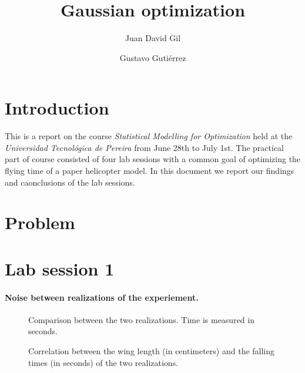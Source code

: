 \documentclass{scrartcl}
\title{Gaussian optimization}
\author{Juan David Gil \and Gustavo Gutiérrez}
\date{}
\begin{document}
\maketitle
\section{Introduction}
This is a report on the course \emph{Statistical Modelling for Optimization}
held at the \emph{Universidad Tecnológica de Pereira} from June 28th to July
1st. The practical part of course consisted of four lab sessions with a common
goal of optimizing the flying time of a paper helicopter model. In this document
we report our findings and caonclusions of the lab sessions.
\section{Problem}

\section{Lab session 1}

\paragraph{Noise between realizations of the experiement.}
\begin{figure}

\label{fig_t1t2}
\caption{Comparison between the two realizations. Time is measured in seconds.}
\end{figure}

\begin{figure}

\label{fig_wl_times}
\caption{Correlation between the wing length (in centimeters) and the falling
times (in seconds) of the two realizations.}
\end{figure}
\end{document}
